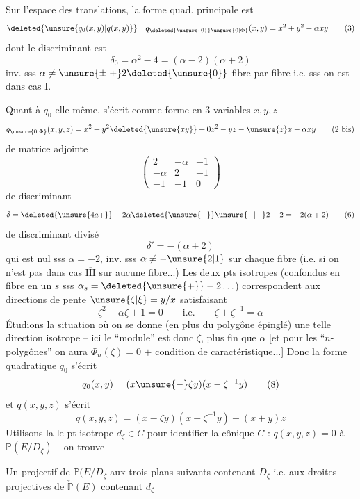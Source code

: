 Sur l'espace des translations, la forme quad. principale est
\[
\deleted{\unsure{q_0(x,y)|q(x,y)}}\quad q_{\deleted{\unsure{0}}\unsure{0|\Phi}}(x,y)=x^2+y^2-\alpha xy
\tag*{(3)}
\]
 dont le discriminant est
\[
\delta_0=\alpha^2-4=(\alpha-2)(\alpha+2)\tag*{(4)}
\]
inv. sss $\alpha\ne\unsure{\pm|+}2\deleted{\unsure{0}}$ fibre par fibre i.e. sss on est dans cas I.

Quant à $q_0$ elle-même, s'écrit comme forme en $3$ variables $x,y,z$
\[
q_{\unsure{0|\Phi}}(x,y,z)=x^2+y^2\deleted{\unsure{xy}}+0z^2-yz-\unsure{z}x-\alpha xy
\tag*{(2 bis)}
\]
de matrice adjointe
\[
\begin{pmatrix}2&-\alpha&-1\\-\alpha&2&-1\\-1&-1&0\end{pmatrix}
\tag*{(5)}
\]
de discriminant
\[
\delta=\deleted{\unsure{4a+}}-2\alpha\deleted{\unsure{+}}\unsure{-|+}2-2=-2(\alpha+2)
\tag*{(6)}
\]
de discriminant divisé
\[
\delta'=-(\alpha+2)\tag*{(6$'$)}
\]
qui est nul sss $\alpha=-2$, inv. sss $\alpha\ne-\unsure{2|1}$ sur chaque fibre (i.e. si on n'est pas dans cas $\overline{\underline{\mathrm{III}}}$ sur aucune fibre...)
Les deux pts isotropes (confondus  en  fibre en un $s$ sss $\alpha_s=\deleted{\unsure{+}}-2\ldots$) correspondent aux  directions de pente $\unsure{\zeta|\xi}=y/x$ satisfaisant
\[
\zeta^2-\alpha\zeta+1=0\qquad\text{i.e.}\qquad\zeta+\zeta^{-1}=\alpha
\tag*{(7)}
\]
Étudions la situation où on se donne (en plus du polygône épinglé) une telle direction isotrope -- ici le  ``module'' est donc  $\zeta$, plus fin que $\alpha$ [et pour les  ``$n$-polygônes'' on aura $\Phi_n(\zeta)=0$  $+$ condition de caractéristique...] Donc la forme quadratique $q_0$ s'écrit
\[
q_0(x,y)=(x\unsure{-}\zeta y)(x-\zeta^{-1}y)
\tag*{(8)}
\]
et $q(x,y,z)$ s'écrit
\[
q(x,y,z)=(x-\zeta y)(x-\zeta^{-1}y)-(x+y)z
\tag*{(9)}
\]
Utilisons \deleted{\unsure{$\zeta$}} la  le pt isotrope $d_\zeta\in C$  pour identifier la cônique $C$ : $q(x,y,z)=0$ à $\mathbb P(E/D_\zeta)$ -- on trouve

Un  projectif de $\mathbb P(E/D_\zeta$  aux trois plans suivants contenant $D_\zeta$ i.e. aux droites projectives de $\check{\mathbb P}(E)$ contenant $d_\zeta$

